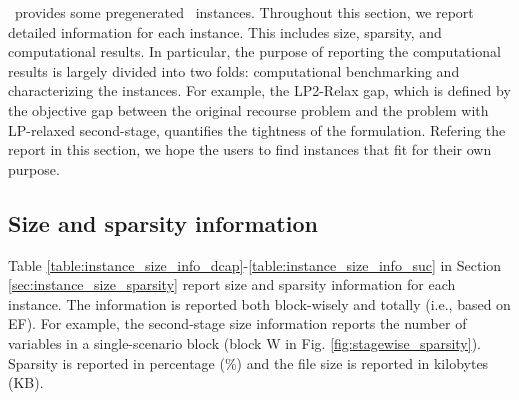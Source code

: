 %
%

\siplibtwo\ provides some pregenerated \smps\ instances. Throughout this section, we report detailed information for each instance. This includes size, sparsity, and computational results. In particular, the purpose of reporting the computational results is largely divided into two folds: computational benchmarking and characterizing the instances. For example, the LP2-Relax gap, which is defined by the objective gap between the original recourse problem and the problem with LP-relaxed second-stage, quantifies the tightness of the formulation. Refering the report in this section, we hope the users to find instances that fit for their own purpose.


\subsection{Size and sparsity information}
Table \ref{table:instance_size_info_dcap}-\ref{table:instance_size_info_suc} in Section \ref{sec:instance_size_sparsity} report size and sparsity information for each instance. The information is reported both block-wisely and totally (i.e., based on EF). For example, the second-stage size information reports the number of variables in a single-scenario block (block W in Fig. \ref{fig:stagewise_sparsity}). Sparsity is reported in percentage (\%) and the file size is reported in kilobytes (KB).

